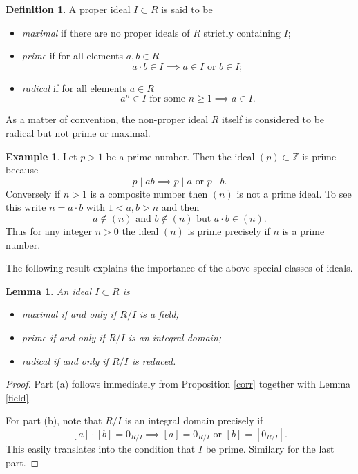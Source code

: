 \documentclass [12pt,oneside,a4paper,mathscr]{amsart}
\newtheorem{lemma}[thm]{Lemma}
\theoremstyle{definition}
\newtheorem{defn}[thm]{Definition}
\newtheorem{example}[thm]{Example}
\renewcommand{\geq}{\geqslant}
\newcommand{\Z}{\mathbb Z}
\newcommand{\divides}{\mid}
\begin{document}
\begin{defn}
A proper ideal $I\subset R$ is said to be 
\begin{itemize}
\item[(a)]
\emph{maximal} if there are no proper ideals of $R$ strictly containing $I$;
\smallskip
\item[(b)] \emph{prime} if for all elements $a,b\in R$
\[a\cdot b\in I \implies a\in I \text{ or } b\in I;\]
\item[(c)] \emph{radical} if for all elements $a\in R$
\[a^n\in I \text{ for some }n \geq 1 \implies a\in I.\]
\end{itemize}
\end{defn}

As a matter of convention, the non-proper ideal $R$ itself is considered to be radical but not prime or maximal.

\begin{example}
Let $p>1$ be a prime number. Then the  ideal $(p)\subset \Z$  is prime  because \[p\divides ab \implies p\divides a \text{ or }p\divides b.\]
Conversely if $n>1$ is a composite number then $(n)$ is not a prime ideal. To see this write $n=a\cdot b$ with $1<a,b>n$ and then
\[a\notin (n)\text{ and }b\notin (n)\text{ but }a\cdot b\in (n).\]
Thus for any integer $n>0$ the ideal $(n)$ is prime precisely if $n$ is a prime number.
\end{example}


The following result explains the importance of the above special classes of ideals.

\begin{lemma}
\label{stana}
An ideal $I\subset R$ is
\begin{itemize}
\item[(a)] maximal if and only if $R/I$ is a field;\smallskip
\item[(b)] prime if and only if $R/I$ is an integral domain;\smallskip
\item[(c)] radical if and only if $R/I$ is reduced.
\end{itemize}
\end{lemma}

\begin{proof}
 Part (a) follows immediately from Proposition \ref{corr} together with Lemma \ref{field}.

For part (b), note that  $R/I$ is an integral domain precisely if
\[[a] \cdot [b] = 0_{R/I} \implies [a]=0_{R/I} \text{ or } [b]=[0_{R/I}].\]
This easily translates into the  condition that $I$ be prime. Similary for the last part.
\end{proof}
\end{document}

